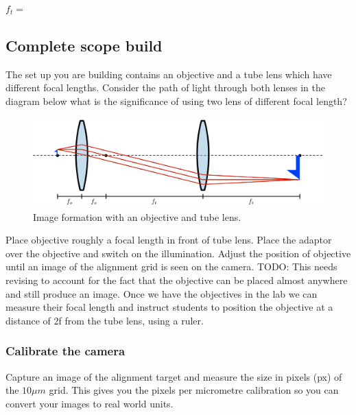 \documentclass[12pt,a4paper,twoside]{article}
\begin{document}
$f_t =$ 

\subsection{Complete scope build}

The set up you are building contains an objective and a tube lens which have different focal lengths. Consider the path of light through both lenses in the diagram below what is the significance of using two lens of different focal length?

\begin{figure}
   \centering
   \includegraphics[width=1\linewidth]{Imaging with 4F.pdf}
   \caption{Image formation with an objective and tube lens.}
   \label{fig:4f system}
\end{figure}

Place objective roughly a focal length in front of tube lens. Place the adaptor over the objective and switch on the illumination. Adjust the position of objective until an image of the alignment grid is seen on the camera. TODO: This needs revising to account for the fact that the objective can be placed almost anywhere and still produce an image. Once we have the objectives in the lab we can measure their focal length and instruct students to position the objective at a distance of 2f from the tube lens, using a ruler.



\subsubsection{Calibrate the camera}

Capture an image of the alignment target and measure the size in pixels (px) of the $10 \mu m$ grid. This gives you the pixels per micrometre calibration so you can convert your images to real world units.
\end{document}

